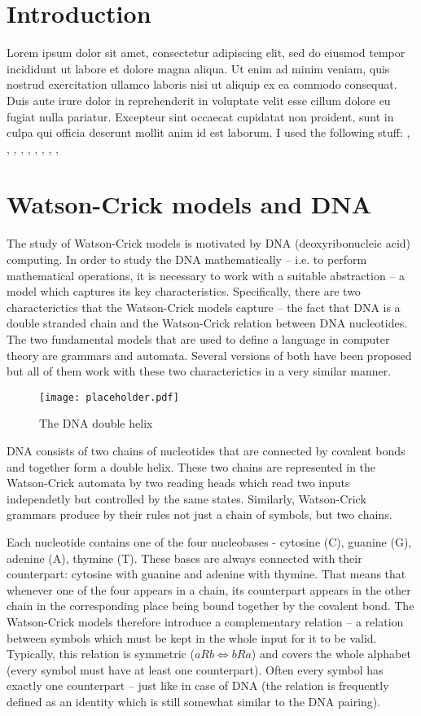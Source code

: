 \chapter{Introduction}

Lorem ipsum dolor sit amet, consectetur adipiscing elit, sed do eiusmod tempor incididunt ut labore et dolore magna aliqua. Ut enim ad minim veniam, quis nostrud exercitation ullamco laboris nisi ut aliquip ex ea commodo consequat. Duis aute irure dolor in reprehenderit in voluptate velit esse cillum dolore eu fugiat nulla pariatur. Excepteur sint occaecat cupidatat non proident, sunt in culpa qui officia deserunt mollit anim id est laborum.
I used the following stuff: \cite{A1}, \cite{DETERM_WKA}, \cite{A3}, \cite{A4}, \cite{A5}, \cite{A6}, \cite{A7}, \cite{WK_CYK}, \cite{WK_PUSHDOWN_AUT}, \cite{WK_FIN_AUT}


\chapter{Watson-Crick models and DNA}
The study of Watson-Crick models is motivated by DNA (deoxyribonucleic acid) computing. In order to study the DNA mathematically -- i.e. to perform mathematical operations, it is necessary to work with a suitable abstraction -- a model which captures its key characteristics. Specifically, there are two characterictics that the Watson-Crick models capture -- the fact that DNA is a double stranded chain and the Watson-Crick relation between DNA nucleotides.
The two fundamental models that are used to define a language in computer theory are grammars and automata. Several versions of both have been proposed but all of them work with these two characterictics in a very similar manner.

\begin{figure}
  \texttt{[image: placeholder.pdf]}
  \centering
  \caption{The DNA double helix}
\end{figure}

DNA consists of two chains of nucleotides that are connected by covalent bonds and together form a double helix. These two chains are represented in the Watson-Crick automata by two reading heads which read two inputs independetly but controlled by the same states. Similarly, Watson-Crick grammars produce by their rules not just a chain of symbols, but two chains.

Each nucleotide contains one of the four nucleobases - cytosine (C), guanine (G), adenine (A), thymine (T). These bases are always connected with their counterpart: cytosine with guanine and adenine with thymine. That means that whenever one of the four appears in a chain, its counterpart appears in the other chain in the corresponding place being bound together by the covalent bond. The Watson-Crick models therefore introduce a complementary relation -- a relation between symbols which must be kept in the whole input for it to be valid. Typically, this relation is symmetric ($a R b \Leftrightarrow b R a$) and covers the whole alphabet (every symbol must have at least one counterpart). Often every symbol has exactly one counterpart -- just like in case of DNA (the relation is frequently defined as an identity which is still somewhat similar to the DNA pairing).

